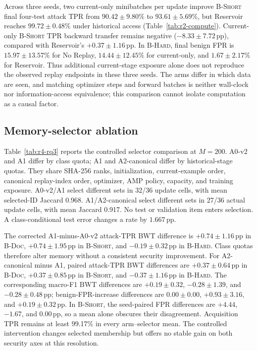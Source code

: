 \documentclass[conference]{IEEEtran}
\newcommand{\pp}{\,\mathrm{pp}}
\newcommand{\bdoc}{\textsc{B-Doc}}
\newcommand{\bshort}{\textsc{B-Short}}
\newcommand{\bhard}{\textsc{B-Hard}}
\begin{document}
Across three seeds, two current-only minibatches per update improve \bshort{} final four-test attack TPR from $90.42\pm9.80\%$ to $93.61\pm5.69\%$, but Reservoir reaches $99.72\pm0.48\%$ under historical access (Table~\ref{tab:r2-compute}). Current-only \bshort{} TPR backward transfer remains negative ($-8.33\pm7.72\pp$), compared with Reservoir's $+0.37\pm1.16\pp$. In \bhard{}, final benign FPR is $15.97\pm13.57\%$ for No Replay, $14.44\pm12.45\%$ for current-only, and $1.67\pm2.17\%$ for Reservoir. Thus additional current-stage exposure alone does not reproduce the observed replay endpoints in these three seeds. The arms differ in which data are seen, and matching optimizer steps and forward batches is neither wall-clock nor information-access equivalence; this comparison cannot isolate computation as a causal factor.



\subsection{Memory-selector ablation}\label{sec:ablation}

Table~\ref{tab:r4-rq3} reports the controlled selector comparison at $M=200$. A0-v2 and A1 differ by class quota; A1 and A2-canonical differ by historical-stage quotas. They share SHA-256 ranks, initialization, current-example order, canonical replay-index order, optimizer, AMP policy, capacity, and training exposure. A0-v2/A1 select different sets in 32/36 update cells, with mean selected-ID Jaccard 0.968. A1/A2-canonical select different sets in 27/36 actual update cells, with mean Jaccard 0.917. No test or validation item enters selection. A class-conditional test error changes a rate by $1.667\pp$.

The corrected A1-minus-A0-v2 attack-TPR BWT difference is $+0.74\pm1.16\pp$ in \bdoc{}, $+0.74\pm1.95\pp$ in \bshort{}, and $-0.19\pm0.32\pp$ in \bhard{}. Class quotas therefore alter memory without a consistent security improvement. For A2-canonical minus A1, paired attack-TPR BWT differences are $+0.37\pm0.64\pp$ in \bdoc{}, $+0.37\pm0.85\pp$ in \bshort{}, and $-0.37\pm1.16\pp$ in \bhard{}. The corresponding macro-F1 BWT differences are $+0.19\pm0.32$, $-0.28\pm1.39$, and $-0.28\pm0.48\pp$; benign-FPR-increase differences are $0.00\pm0.00$, $+0.93\pm3.16$, and $+0.19\pm0.32\pp$. In \bshort{}, the seed-paired FPR differences are $+4.44$, $-1.67$, and $0.00\pp$, so a mean alone obscures their disagreement. Acquisition TPR remains at least 99.17\% in every arm--selector mean. The controlled intervention changes selected membership but offers no stable gain on both security axes at this resolution.
\end{document}
